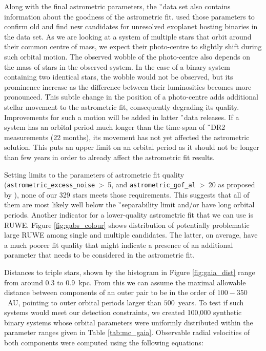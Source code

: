 Along with the final astrometric parameters, the \G\ data set also contains information about the goodness of the astrometric fit. \citet{2018RNAAS...2b..20E} used those parameters to confirm old and find new candidates for unresolved exoplanet hosting binaries in the data set. As we are looking at a system of multiple stars that orbit around their common centre of mass, we expect their photo-centre to slightly shift during such orbital motion. The observed wobble of the photo-centre also depends on the mass of stars in the observed system. In the case of a binary system containing two identical stars, the wobble would not be observed, but its prominence increase as the difference between their luminosities becomes more pronounced. This subtle change in the position of a photo-centre adds additional stellar movement to the astrometric fit, consequently degrading its quality. Improvements for such a motion will be added in latter \G\ data releases. If a system has an orbital period much longer than the time-span of \G\ DR2 measurements (22 months), its movement has not yet affected the astrometric solution. This puts an upper limit on an orbital period as it should not be longer than few years in order to already affect the astrometric fit results. 

Setting limits to the parameters of astrometric fit quality (\texttt{astrometric\_excess\_noise}~>~5, and \texttt{astrometric\_gof\_al}~>~20 as proposed by \citet{2018RNAAS...2b..20E}), none of our 329 stars meets those requirements. This suggests that all of them are most likely well below the \G\ separability limit and/or have long orbital periods. Another indicator for a lower-quality astrometric fit that we can use is RUWE. Figure \ref{fig:gabs_colour} shows distribution of potentially problematic large RUWE among single and multiple candidates. The latter, on average, have a much poorer fit quality that might indicate a presence of an additional parameter that needs to be considered in the astrometric fit. 

Distances to triple stars, shown by the histogram in Figure \ref{fig:gaia_dist} range from around $0.3$ to $0.9$~kpc. From this we can assume the maximal allowable distance between components of an outer pair to be in the order of $100-350$~AU, pointing to outer orbital periods larger than $500$~years. To test if such systems would meet our detection constraints, we created 100,000 synthetic binary systems whose orbital parameters were uniformly distributed within the parameter ranges given in Table \ref{tab:mc_gaia}. Observable radial velocities of both components were computed using the following equations:

